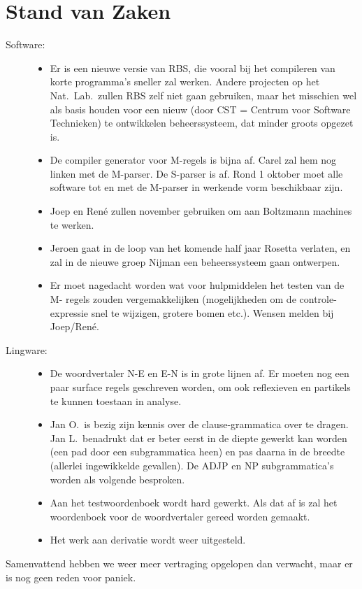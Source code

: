 \section{Stand van Zaken}
\begin{description}
\item [Software:]\mbox{}
  \begin{itemize}
  \item Er is een nieuwe versie van RBS, die vooral bij het compileren van 
korte programma's sneller zal werken. Andere projecten op het Nat.\ Lab.\ 
zullen RBS zelf niet gaan gebruiken, maar het misschien wel als basis houden 
voor een nieuw (door CST = Centrum voor Software Technieken) te ontwikkelen 
beheerssysteem, dat minder groots opgezet is.
  \item De compiler generator voor M-regels is bijna af. Carel zal hem nog 
linken met de M-parser. De S-parser is af. Rond 1 oktober moet alle software 
tot en met de M-parser in werkende vorm beschikbaar zijn.
  \item Joep en Ren\'{e} zullen november gebruiken om aan Boltzmann machines te 
werken.
  \item Jeroen gaat in de loop van het komende half jaar Rosetta verlaten, en 
zal in de nieuwe groep Nijman een beheerssysteem gaan ontwerpen.
  \item Er moet nagedacht worden wat voor hulpmiddelen het testen van de M-
regels zouden vergemakkelijken (mogelijkheden om de controle-expressie snel te 
wijzigen, grotere bomen etc.). Wensen melden bij Joep/Ren\'{e}.
  \end{itemize}
\item [Lingware:]\mbox{}
  \begin{itemize}
  \item De woordvertaler N-E en E-N is in grote lijnen af. Er moeten nog een 
paar surface regels geschreven worden, om ook reflexieven en partikels 
te kunnen toestaan in analyse. 
  \item Jan O.\ is bezig zijn kennis over de clause-grammatica over te dragen. 
Jan L.\ benadrukt dat er beter eerst in de diepte gewerkt kan worden (een pad 
door een subgrammatica heen) en pas daarna in de breedte (allerlei ingewikkelde 
gevallen). De ADJP en NP subgrammatica's worden als volgende besproken.
  \item Aan het testwoordenboek wordt hard gewerkt. Als dat af is zal het 
woordenboek voor de woordvertaler gereed worden gemaakt.
  \item  Het werk aan derivatie wordt weer uitgesteld.
  \end{itemize}
\end{description}
Samenvattend hebben we weer meer vertraging opgelopen dan verwacht, maar er is 
nog geen reden voor paniek.

